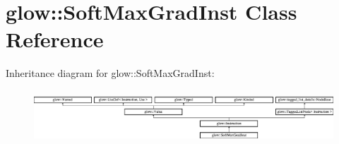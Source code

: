\hypertarget{classglow_1_1_soft_max_grad_inst}{}\section{glow\+:\+:Soft\+Max\+Grad\+Inst Class Reference}
\label{classglow_1_1_soft_max_grad_inst}
Inheritance diagram for glow\+:\+:Soft\+Max\+Grad\+Inst\+:\begin{figure}[H]
\begin{center}
\leavevmode
\includegraphics[height=1.991111cm]{classglow_1_1_soft_max_grad_inst}
\end{center}
\end{figure}

